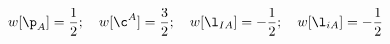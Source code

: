 \begin{equation}
\label{pesos}w[\p_A]=\frac{1}{2};\quad w[\c^A]=\frac{3}{2};\quad
w[\l_{IA}]=-\frac{1}{2};\quad w[\l_{iA}]=-\frac{1}{2}
\end{equation}

